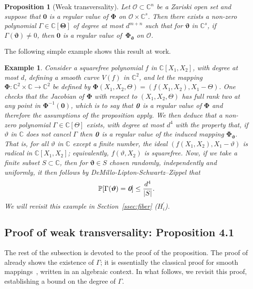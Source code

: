 \documentclass[a4paper]{article}
\def\bz{\textit{\textbf{0}}}
\def\Thetab{\bm{\Theta}}
\def\thetab{\bm{\vartheta}}
\def\vt{\vartheta}
\def\dt{s}
\def\C{\mathbb{C}}
\newtheorem{ex}[theorem]{Example}
\newtheorem{prop}[theorem]{Proposition}
\begin{document}
\begin{prop} [Weak transversality]\label{prop:weak_t}
Let $\mathscr{O} \subset \C^n$ be a Zariski open set and suppose that $\bm 0$ is a regular value of $\bm\Phi$ on $\mathscr{O} \times \C^{s}$. Then there
    exists a non-zero polynomial $\Gamma \in \C[\Thetab]$ of degree at
    most $d^{m+n}$ such that for $\thetab$ in $\C^\dt$, if
    $\Gamma(\thetab)\ne 0$, then $\bm 0$ is a regular value
    of~$\bm\Phi_{\thetab}$ on $\mathscr{O}$.
\end{prop}
\noindent 
The following simple example shows this result at work. 
%
\begin{ex}
Consider a
squarefree polynomial $f$ in $\C[X_1,X_2]$, with degree at most $d$, defining a smooth curve  $V(f)$ in
$\C^2$, and let the mapping $\bm\Phi:\C^2\times \C \to \C^2$ be
defined by $\bm\Phi(X_1,X_2,\Theta) = (f(X_1,X_2), X_1-\Theta)$. One
checks that the Jacobian of $\bm\Phi$ with respect to
$(X_1,X_2,\Theta)$ has full rank two at any point in $\bm\Phi^{-1}(\bm 0)$, which is to say that $\bz$ is a regular value of $\bm \Phi$ and therefore the assumptions of the proposition apply. We then deduce that a non-zero polynomial $\Gamma \in \C[\Theta]$ exists, with degree at most $d^{4}$ with the property that, if $\vartheta$ in $\C$ does not cancel $\Gamma$ then $\bz$ is a regular value of the induced mapping $\bm \Phi_{\bm \vt}$. That is, for all $\vartheta$ in $\C$
except a finite number, the ideal $(f(X_1,X_2), X_1-\vartheta)$ is
radical in $\C[X_1,X_2]$; equivalently, $f(\vartheta, X_2)$ is
squarefree. Now, if we take a finite subset $S \subset \C$, then for $\bm \vt \in S$ chosen randomly, independently and uniformly, it then follows by DeMillo-Lipton-Schwartz–Zippel that 
\[
\mathbb{P}[\Gamma(\bm \vt) = \bz] \leq \frac{d^4}{|S|}.
\]
We will revisit this example in Section~\ref{ssec:fiber} ($H_i^{'}$).
\end{ex}
%


\subsection{Proof of weak transversality: Proposition 4.1}
The rest of the subsection is devoted to the proof of the proposition.
The proof of \cite[Theorem B.3]{TWT} already shows the existence of
$\Gamma$; it is essentially the classical proof for smooth
mappings~\cite[Section~3.7]{demazure2000bifurcations}, written in an
algebraic context. In what follows, we revisit this proof,
establishing a bound on the degree of $\Gamma$.
\end{document}
